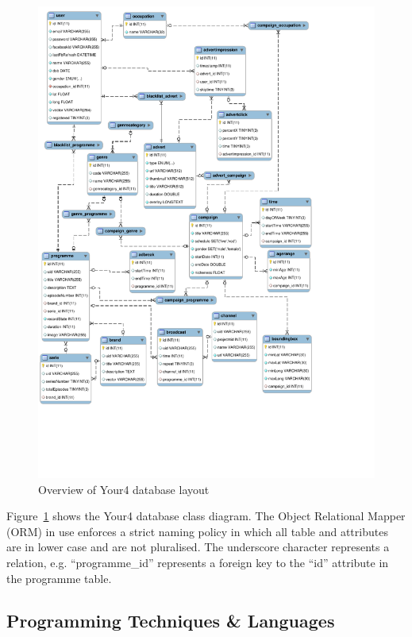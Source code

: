 \begin{figure}[H]
	\centering
	\includegraphics[trim = 0 3.7cm 3.5cm 0, clip, width=\textwidth]{images/your4-db.pdf}
	\caption{Overview of Your4 database layout}
	\label{fig:your4-db}
\end{figure}

Figure~\ref{fig:your4-db} shows the Your4 database class diagram. The Object Relational Mapper (ORM) in use enforces a strict naming policy in which all table and attributes are in lower case and are not pluralised. The underscore character represents a relation, e.g. ``programme\_id'' represents a foreign key to the ``id'' attribute in the programme table.

\subsection{Programming Techniques \& Languages}

